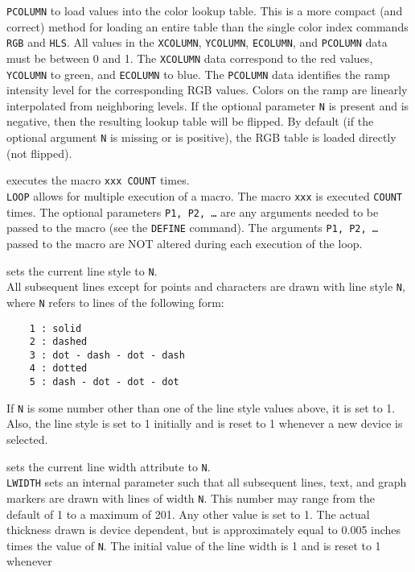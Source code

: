 	{\tt PCOLUMN}
	to load values into the color lookup table.  This is a more
	compact (and correct) method for loading an entire table than
	the single color index commands {\tt RGB} and
	{\tt HLS}.  All values in the
	{\tt XCOLUMN},
	{\tt YCOLUMN},
	{\tt ECOLUMN}, and
	{\tt PCOLUMN} data must be between 0 and 1.
	The {\tt XCOLUMN} data correspond to the
	red values, {\tt YCOLUMN} to green, and
	{\tt ECOLUMN} to blue.  The
	{\tt PCOLUMN} data identifies the
	ramp intensity level for the corresponding RGB values.  Colors
	on the ramp are linearly interpolated from neighboring levels.
	If the optional parameter {\tt N} is present and is negative,
	then the resulting lookup table will be flipped.  By default (if the
	optional argument {\tt N} is missing or is positive), the
	RGB table is loaded directly (not flipped).
\item [{\tt LOOP count xxx [p1 p2 \dots] } --] executes the macro {\tt xxx COUNT} times.\\
	{\tt LOOP} allows for multiple execution of a macro.
	The macro {\tt xxx} is executed {\tt COUNT} times.
	The optional parameters {\tt P1, P2, \dots}
	are any arguments needed to be passed to the macro (see the
	{\tt DEFINE} command).  The arguments
	{\tt P1, P2, \dots} passed to the macro are NOT altered
	during each execution of the loop.
\item [{\tt LSTYLE N } --] sets the current line style to {\tt N}.\\
	All subsequent lines except for points and characters are drawn
	with line style {\tt N}, where {\tt N} refers to
	lines of the following form:
	\begin{verbatim}
    1 : solid
    2 : dashed
    3 : dot - dash - dot - dash
    4 : dotted
    5 : dash - dot - dot - dot
	\end{verbatim}
	If {\tt N} is some number other than one of the line style
	values above, it is set to 1.  Also, the line style is set to 1
	initially and is reset to 1 whenever a new device is selected.
\item [{\tt LWIDTH N } --] sets the current line width attribute to {\tt N}.\\
	{\tt LWIDTH} sets an internal parameter such that all
	subsequent lines, text, and graph markers are drawn with lines
	of width {\tt N}.  This number may range from the default
	of 1 to a maximum of 201.  Any other value is set to 1.  The
	actual thickness drawn is device dependent, but is approximately
	equal to 0.005 inches times the value of {\tt N}.  The
	initial value of the line width is 1 and is reset to 1 whenever
